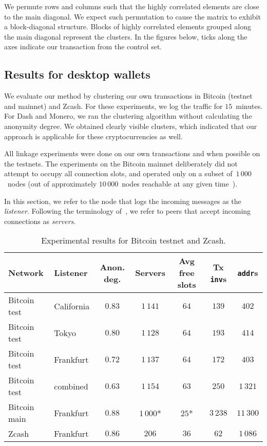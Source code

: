 We permute rows and columns such that the highly correlated elements are close to the main diagonal.
We expect such permutation to cause the matrix to exhibit a block-diagonal structure.
Blocks of highly correlated elements grouped along the main diagonal represent the clusters.
In the figures below, ticks along the axes indicate our transaction from the control set.


\subsection{Results for desktop wallets}

We evaluate our method by clustering our own transactions in Bitcoin (testnet and mainnet) and Zcash.
For these experiments, we log the traffic for $15$~minutes.
For Dash and Monero, we ran the clustering algorithm without calculating the anonymity degree.
We obtained clearly visible clusters, which indicated that our approach is applicable for these cryptocurrencies as well.

All linkage experiments were done on our own transactions and when possible on the testnets.
The experiments on the Bitcoin mainnet deliberately did not attempt to occupy all connection slots, and operated only on a subset of~$1\,000$~nodes (out of approximately $10\,000$~nodes reachable at any given time~\cite{Bitnodes}).

In this section, we refer to the node that logs the incoming messages as the \textit{listener}.
Following the terminology of~\cite{Biryukov2014}, we refer to peers that accept incoming connections as \textit{servers}.

\begin{table*}[!t]
	\normalsize
	\caption{Experimental results for Bitcoin testnet and Zcash.}
	\centering
	\begin{tabular}{|l|l|c|c|c|c|c|}
		\hline
		Network & Listener & Anon\@. deg. & Servers & Avg free slots & Tx \texttt{inv}s & \texttt{addr}s \\
		\hline
		Bitcoin test & California & $0.83$ & $1\,141$ & $64$ & $139$ & $402$ \\
		Bitcoin test & Tokyo & $0.80$ & $1\,128$ & $64$ & $193$ & $414$ \\
		Bitcoin test & Frankfurt & $0.72$ & $1\,137$ & $64$ & $172$ & $403$ \\
		Bitcoin test & combined & $0.63$ & $1\,154$ & $63$ & $250$ & $1\,321$ \\
		Bitcoin main & Frankfurt & $0.88$ & $1\,000$* & $25$* & $3\,238$ & $11\,300$ \\
		Zcash & Frankfurt & $0.86$ & $206$ & $36$ & $62$ & $1\,086$ \\
		\hline
	\end{tabular}
	\label{tab:results}
\end{table*}


